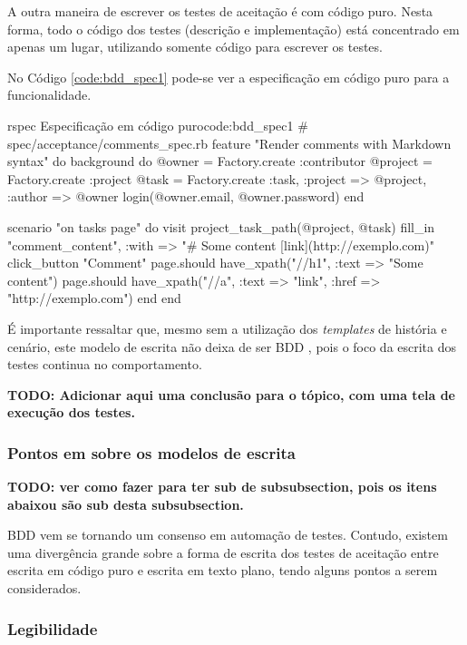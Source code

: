 A outra maneira de escrever os testes de aceitação é com código puro. Nesta forma, todo o código dos testes (descrição e implementação) está concentrado em apenas um lugar, utilizando somente código para escrever os testes.

No Código \ref{code:bdd_spec1} pode-se ver a especificação em código puro para a funcionalidade.

\begin{mycode}{rspec}%
{Especificação em código puro}{code:bdd_spec1}
# spec/acceptance/comments_spec.rb
feature "Render comments with Markdown syntax" do
  background do
    @owner = Factory.create :contributor
    @project = Factory.create :project
    @task = Factory.create :task, :project => @project, :author => @owner
    login(@owner.email, @owner.password)
  end

  scenario "on tasks page" do
    visit project_task_path(@project, @task)
    fill_in "comment_content", :with => "# Some content [link](http://exemplo.com)"
    click_button "Comment"
    page.should have_xpath("//h1", :text => "Some content")
    page.should have_xpath("//a", :text => "link", :href => "http://exemplo.com")
  end
end
\end{mycode}

É importante ressaltar que, mesmo sem a utilização dos \textit{templates} de história e cenário, este modelo de escrita não deixa de ser BDD \cite{BDDSolis}, pois o foco da escrita dos testes continua no comportamento.

\textbf{TODO: Adicionar aqui uma conclusão para o tópico, com uma tela de execução dos testes.}


\subsubsection{Pontos em sobre os modelos de escrita}
\label{ssub:pontos em aberto}

\textbf{TODO: ver como fazer para ter sub de subsubsection, pois os itens abaixou são sub desta subsubsection.}

BDD vem se tornando um consenso em automação de testes. Contudo, existem uma divergência grande sobre a forma de escrita dos testes de aceitação entre escrita em código puro e escrita em texto plano, tendo alguns pontos a serem considerados.


\subsubsection{Legibilidade}
\label{ssub:legibilidade}

